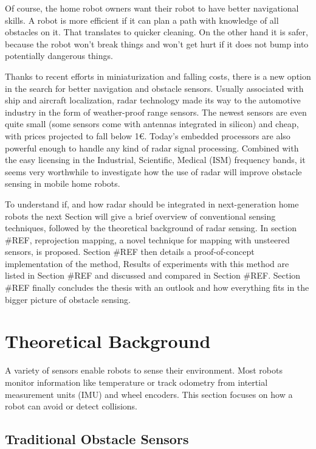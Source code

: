 Of course, the home robot owners want their robot to have better
navigational skills. A robot is more efficient if it can plan a path
with knowledge of all obstacles on it. That translates to quicker
cleaning. On the other hand it is safer, because the robot won't break
things and won't get hurt if it does not bump into potentially dangerous
things.

Thanks to recent efforts in miniaturization and falling costs, there is
a new option in the search for better navigation and obstacle sensors.
Usually associated with ship and aircraft localization, radar technology
made its way to the automotive industry in the form of weather-proof
range sensors. The newest sensors are even quite small (some sensors
come with antennas integrated in silicon) and cheap, with prices
projected to fall below 1\euro{}\cite{Brouwer2015}. Today's embedded
processors are also powerful enough to handle any kind of radar signal
processing. Combined with the easy licensing in the Industrial,
Scientific, Medical (ISM) frequency bands, it seems very worthwhile to
investigate how the use of radar will improve obstacle sensing in mobile
home robots.

To understand if, and how radar should be integrated in next-generation
home robots the next Section will give a brief overview of conventional
sensing techniques, followed by the theoretical background of radar
sensing. In section \#REF, reprojection mapping, a novel technique for
mapping with unsteered sensors, is proposed. Section \#REF then details
a proof-of-concept implementation of the method, Results of experiments
with this method are listed in Section \#REF and discussed and compared
in Section \#REF. Section \#REF finally concludes the thesis with an
outlook and how everything fits in the bigger picture of obstacle
sensing.

\section{Theoretical Background}\label{theoretical-background}

A variety of sensors enable robots to sense their environment. Most
robots monitor information like temperature or track odometry from
intertial measurement units (IMU) and wheel encoders. This section
focuses on how a robot can avoid or detect collisions.

\subsection{Traditional Obstacle
Sensors}\label{traditional-obstacle-sensors}

